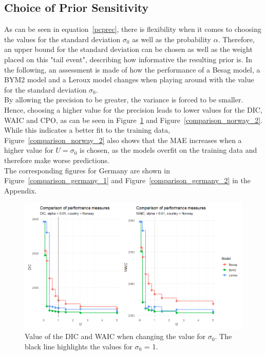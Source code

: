 \subsection{Choice of Prior Sensitivity}
As can be seen in equation~\ref{pcprec}, there is flexibility when it comes to choosing the values for the standard deviation $\sigma_0$ as well as the probability $\alpha$. Therefore, an upper bound for the standard deviation can be chosen as well as the weight placed on this "tail event", describing how informative the resulting prior is. In the following, an assessment is made of how the performance of a Besag model, a BYM2 model and a Leroux model changes when playing around with the value for the standard deviation $\sigma_0$. \\
By allowing the precision to be greater, the variance is forced to be smaller. Hence, choosing a higher value for the precision leads to lower values for the DIC, WAIC and CPO, as can be seen in Figure~\ref{comparison_norway_1} and Figure~\ref{comparison_norway_2}. While this indicates a better fit to the training data, Figure~\ref{comparison_norway_2} also shows that the MAE increases when a higher value for $U=\sigma_0$ is chosen, as the models overfit on the training data and therefore make worse predictions. \\
The corresponding figures for Germany are shown in Figure~\ref{comparison_germany_1} and Figure~\ref{comparison_germany_2} in the Appendix.
\begin{figure}[H]
    \centering
    \includegraphics[width = \textwidth]{comparison_1_norway.png}
    \caption{Value of the DIC and WAIC when changing the value for $\sigma_0$. The black line highlights the values for $\sigma_0$ = 1.}
    \label{comparison_norway_1}
\end{figure}
